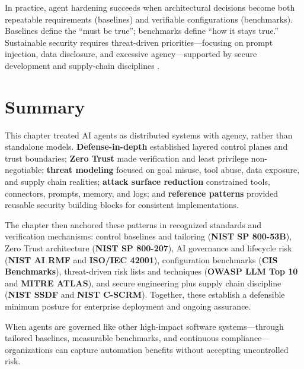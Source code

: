 \begin{TNtwocol}
      In practice, agent hardening succeeds when architectural decisions become both repeatable requirements (baselines) and verifiable configurations (benchmarks). Baselines define the “must be true”; benchmarks define “how it stays true.” Sustainable security requires threat-driven priorities—focusing on prompt injection, data disclosure, and excessive agency—supported by secure development and supply-chain disciplines \cite{OWASP_LLM_Top10, NIST_SP800_218, NIST_SP800_161R1}.


      \section{Summary}

      This chapter treated AI agents as distributed systems with agency, rather than standalone models.
      \textbf{Defense-in-depth} established layered control planes and trust boundaries;
      \textbf{Zero Trust} made verification and least privilege non-negotiable;
      \textbf{threat modeling} focused on goal misuse, tool abuse, data exposure, and supply chain realities;
      \textbf{attack surface reduction} constrained tools, connectors, prompts, memory, and logs;
      and \textbf{reference patterns} provided reusable security building blocks for consistent implementations.

      The chapter then anchored these patterns in recognized standards and verification mechanisms:
      control baselines and tailoring (\textbf{NIST SP 800-53B}),
      Zero Trust architecture (\textbf{NIST SP 800-207}),
      AI governance and lifecycle risk (\textbf{NIST AI RMF} and \textbf{ISO/IEC 42001}),
      configuration benchmarks (\textbf{CIS Benchmarks}),
      threat-driven risk lists and techniques (\textbf{OWASP LLM Top 10} and \textbf{MITRE ATLAS}),
      and secure engineering plus supply chain discipline (\textbf{NIST SSDF} and \textbf{NIST C-SCRM}).
      Together, these establish a defensible minimum posture for enterprise deployment and ongoing assurance.

      When agents are governed like other high-impact software systems—through tailored baselines, measurable benchmarks, and continuous compliance—organizations can capture automation benefits without accepting uncontrolled risk.

\end{TNtwocol}